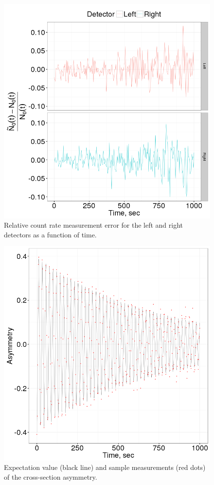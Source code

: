 \documentclass{report}
\begin{document}
\begin{figure}[H]
	\centering
	\includegraphics[width=\textwidth]{edm_img/LR_detector_relErr}
	\caption{Relative count rate measurement error for the left and right detectors as a function of time.\label{fig:LRDetErr}}
\end{figure}

\begin{figure}[H]
	\centering
	\includegraphics[width=\textwidth]{edm_img/Asymmetry}
	\caption{Expectation value (black line) and sample measurements (red dots) of the cross-section asymmetry.\label{fig:Asym}}
\end{figure}
\end{document}
